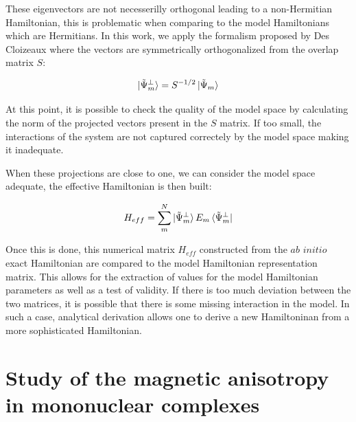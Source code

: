 \documentclass[10pt]{report}
\numberwithin{equation}{section}
\begin{document}
These eigenvectors are not necesserilly orthogonal leading to a non-Hermitian Hamiltonian, this is problematic when comparing to the model Hamiltonians which are Hermitians.
In this work, we apply the formalism proposed by Des Cloizeaux where the vectors are symmetrically orthogonalized from the overlap matrix $S$:

\begin{equation}
    \ket{\tilde{\Psi}_m^\bot}=S^{-1/2} \ket{\tilde{\Psi}_m}
\end{equation}

At this point, it is possible to check the quality of the model space by calculating the norm of the projected vectors present in the $S$ matrix.
If too small, the interactions of the system are not captured correctely by the model space making it inadequate. 
\par When these projections are close to one, we can consider the model space adequate, the effective Hamiltonian is then built:

\begin{equation}
    H_{eff}=\sum_{m}^{N}\ket{\tilde{\Psi}_m^{\bot}}E_m \bra{\tilde{\Psi}_m^{\bot}}
\end{equation}

Once this is done, this numerical matrix $H_{eff}$ constructed from the $\textit{ab}$ $\textit{initio}$ exact Hamiltonian are compared to the model Hamiltonian representation matrix. 
This allows for the extraction of values for the model Hamiltonian parameters as well as a test of validity.
If there is too much deviation between the two matrices, it is possible that there is some missing interaction in the model.
In such a case, analytical derivation allows one to derive a new Hamiltoninan from a more sophisticated Hamiltonian.

\chapter{Study of the magnetic anisotropy in mononuclear complexes}
\end{document}
